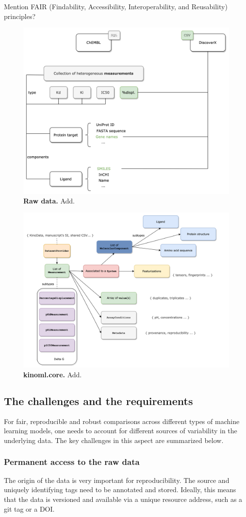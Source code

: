 \documentclass[9pt,lineno]{elife}
\begin{document}
Mention FAIR (Findability, Accessibility, Interoperability, and Reusability)~\cite{Wilkinson_2016_scientificdata} principles?


\begin{figure}
\centering
\includegraphics[width=0.5\linewidth]{figures/kinodata.png}
\caption{\textbf{Raw data.} Add.}
\label{fig:kinodata}
\end{figure}

\begin{figure}
\centering
\includegraphics[width=0.5\linewidth]{figures/object_model.png}
\caption{\textbf{kinoml.core.} Add.}
\label{fig:object_model}
\end{figure}

\subsection{The challenges and the requirements}

For fair, reproducible and robust comparisons across different types of machine learning models, one needs to account for different sources of variability in the underlying data. The key challenges in this aspect are summarized below.

\subsubsection{Permanent access to the raw data}

The origin of the data is very important for reproducibility. The source and uniquely identifying tags need to be annotated and stored. Ideally, this means that the data is versioned and available via a unique resource address, such as a git tag or a DOI.
\end{document}
